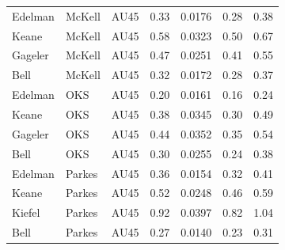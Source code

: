 \documentclass{monashthesis}
\begin{document}
\begin{center}
\begin{longtable}{lllllll}
Edelman & McKell & AU45 & 0.33 & 0.0176 & 0.28 & 0.38 \\
Keane & McKell & AU45 & 0.58 & 0.0323 & 0.50 & 0.67 \\
Gageler & McKell & AU45 & 0.47 & 0.0251 & 0.41 & 0.55 \\
Bell & McKell & AU45 & 0.32 & 0.0172 & 0.28 & 0.37 \\
Edelman & OKS & AU45 & 0.20 & 0.0161 & 0.16 & 0.24 \\
Keane & OKS & AU45 & 0.38 & 0.0345 & 0.30 & 0.49 \\
Gageler & OKS & AU45 & 0.44 & 0.0352 & 0.35 & 0.54 \\
Bell & OKS & AU45 & 0.30 & 0.0255 & 0.24 & 0.38 \\
Edelman & Parkes & AU45 & 0.36 & 0.0154 & 0.32 & 0.41 \\
Keane & Parkes & AU45 & 0.52 & 0.0248 & 0.46 & 0.59 \\
Kiefel & Parkes & AU45 & 0.92 & 0.0397 & 0.82 & 1.04 \\
Bell & Parkes & AU45 & 0.27 & 0.0140 & 0.23 & 0.31 \\
\end{longtable}
\end{center}
\end{document}
